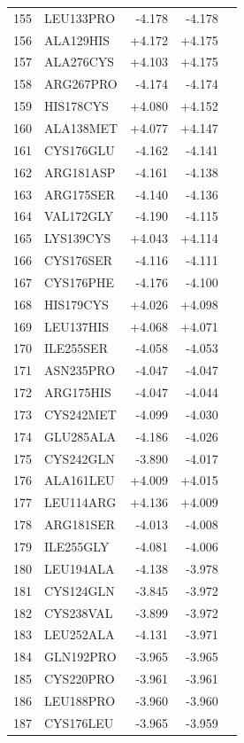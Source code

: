 \begin{longtable}{r l r r c}
155 & LEU133PRO & -4.178 & -4.178 &  \\
156 & ALA129HIS & +4.172 & +4.175 &  \\
157 & ALA276CYS & +4.103 & +4.175 &  \\
158 & ARG267PRO & -4.174 & -4.174 &  \\
159 & HIS178CYS & +4.080 & +4.152 &  \\
160 & ALA138MET & +4.077 & +4.147 &  \\
161 & CYS176GLU & -4.162 & -4.141 &  \\
162 & ARG181ASP & -4.161 & -4.138 &  \\
163 & ARG175SER & -4.140 & -4.136 &  \\
164 & VAL172GLY & -4.190 & -4.115 &  \\
165 & LYS139CYS & +4.043 & +4.114 &  \\
166 & CYS176SER & -4.116 & -4.111 &  \\
167 & CYS176PHE & -4.176 & -4.100 &  \\
168 & HIS179CYS & +4.026 & +4.098 &  \\
169 & LEU137HIS & +4.068 & +4.071 &  \\
170 & ILE255SER & -4.058 & -4.053 &  \\
171 & ASN235PRO & -4.047 & -4.047 &  \\
172 & ARG175HIS & -4.047 & -4.044 &  \\
173 & CYS242MET & -4.099 & -4.030 &  \\
174 & GLU285ALA & -4.186 & -4.026 &  \\
175 & CYS242GLN & -3.890 & -4.017 &  \\
176 & ALA161LEU & +4.009 & +4.015 &  \\
177 & LEU114ARG & +4.136 & +4.009 &  \\
178 & ARG181SER & -4.013 & -4.008 &  \\
179 & ILE255GLY & -4.081 & -4.006 &  \\
180 & LEU194ALA & -4.138 & -3.978 &  \\
181 & CYS124GLN & -3.845 & -3.972 &  \\
182 & CYS238VAL & -3.899 & -3.972 &  \\
183 & LEU252ALA & -4.131 & -3.971 &  \\
184 & GLN192PRO & -3.965 & -3.965 &  \\
185 & CYS220PRO & -3.961 & -3.961 &  \\
186 & LEU188PRO & -3.960 & -3.960 &  \\
187 & CYS176LEU & -3.965 & -3.959 &  \\

\end{longtable}
